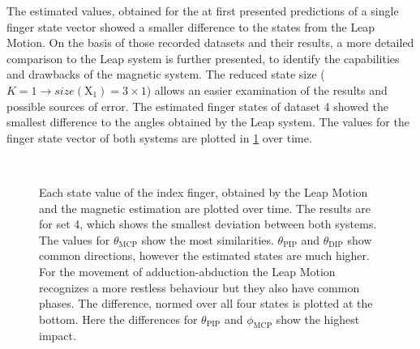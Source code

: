 The estimated values, obtained for the at first presented predictions of a single finger state vector showed a smaller difference to the states from the Leap Motion. On the basis of those recorded datasets and their results, a more detailed comparison to the Leap system is further presented, to identify the capabilities and drawbacks of the magnetic system. The reduced state size ($ K = 1 \rightarrow size(\mathrm{X}_{1}) = 3 \times 1 $) allows an easier examination of the results and possible sources of error. The estimated finger states of dataset 4 showed the smallest difference to the angles obtained by the Leap system. The values for the finger state vector of both systems are plotted in \ref{fig:bestLeap} over time.
\begin{figure}[!htb]
\centering
{}\\
\caption[Comparison of estimated states, which fit best to Leap data]
{Each state value of the index finger, obtained by the Leap Motion and the magnetic estimation are plotted over time. The results are for set 4, which shows the smallest deviation between both systems. The values for $ \theta_{\mathrm{MCP}} $ show the most similarities. $ \theta_{\mathrm{PIP}} $ and $ \theta_{\mathrm{DIP}} $ show common directions, however the estimated states are much higher. For the movement of adduction-abduction the Leap Motion recognizes a more restless behaviour but they also have common phases. The difference, normed over all four states is plotted at the bottom. Here the differences for $ \theta_{\mathrm{PIP}} $ and $ \phi_{\mathrm{MCP}} $ show the highest impact.}
\label{fig:bestLeap}
\end{figure} 
